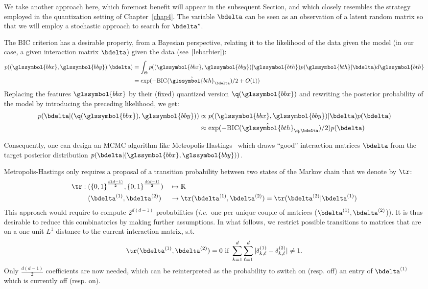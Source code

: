 We take another approach here, which foremost benefit will appear in the subsequent Section, and which closely resembles the strategy employed in the quantization setting of Chapter~\ref{chap4}. The variable $\bdelta$ can be seen as an observation of a latent random matrix so that we will employ a stochastic approach to search for $\bdelta^\star$.

The BIC criterion has a desirable property, from a Bayesian perspective, relating it to the likelihood of the data given the model (in our case, a given interaction matrix $\bdelta$) given the data (see~\ref{lebarbier}):
\begin{align*}
p((\glssymbol{bbx},\glssymbol{bby}) | \bdelta) & = \int_{\Theta} p((\glssymbol{bbx},\glssymbol{bby}) | \glssymbol{bth}) p(\glssymbol{bth} | \bdelta)d\glssymbol{bth} \\
& = \exp(-\text{BIC}(\hat{\glssymbol{bth}}_{\bdelta})/2 + O(1))
\end{align*}
Replacing the features $\glssymbol{bbx}$ by their (fixed) quantized version $\q(\glssymbol{bbx})$ and rewriting the posterior probability of the model by introducing the preceding likelihood, we get:
\begin{align*}
p(\bdelta | (\q(\glssymbol{bbx}),\glssymbol{bby})) & \propto p((\glssymbol{bbx},\glssymbol{bby}) | \bdelta) p(\bdelta) \\
& \approx \exp(-\text{BIC}(\hat{\glssymbol{bth}}_{\q,\bdelta})/2) p(\bdelta)
\end{align*}

Consequently, one can design an MCMC algorithm like Metropolis-Hastings~\cite{hastings1970monte} which draws ``good'' interaction matrices $\bdelta$ from the target posterior distribution $p(\bdelta | (\glssymbol{bbx},\glssymbol{bby}))$.

Metropolis-Hastings only requires a proposal of a transition probability between two states of the Markov chain that we denote by $\tr$:
\begin{alignat}{2}
\tr: \; & ({\{0,1\}}^{\frac{d(d-1)}{2}},{\{0,1\}}^{\frac{d(d-1)}{2}}) && \mapsto \mathbb{R} \nonumber \\ 
& (\bdelta^{(1)},\bdelta^{(2)}) && \to \tr(\bdelta^{(1)},\bdelta^{(2)}) = \tr(\bdelta^{(2)} | \bdelta^{(1)}) \nonumber
\end{alignat}
This approach would require to compute $2^{d(d-1)}$ probabilities (\textit{i.e.}\ one per unique couple of matrices ($\bdelta^{(1)},\bdelta^{(2)}$)). It is thus desirable to reduce this combinatorics by making further assumptions. In what follows, we restrict possible transitions to matrices that are on a one unit $L^1$ distance to the current interaction matrix, s.t.\ 
\[ \tr(\bdelta^{(1)},\bdelta^{(2)}) = 0 \text{ if } \sum_{k=1}^d \sum_{\ell=1}^d |\delta^{(1)}_{k,\ell} - \delta^{(2)}_{k,\ell}| \neq 1. \]
Only $\frac{d(d-1)}{2}$ coefficients are now needed, which can be reinterpreted as the probability to switch on (resp. off) an entry of $\bdelta^{(1)}$ which is currently off (resp. on).

